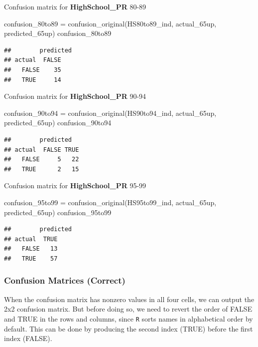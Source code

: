 \documentclass[
]{article}
\newenvironment{Shaded}{\begin{snugshade}}{\end{snugshade}}
\newcommand{\FunctionTok}[1]{\textcolor[rgb]{0.00,0.00,0.00}{#1}}
\newcommand{\NormalTok}[1]{#1}
\newcommand{\OtherTok}[1]{\textcolor[rgb]{0.56,0.35,0.01}{#1}}
\begin{document}
Confusion matrix for \textbf{HighSchool\_PR} 80-89

\begin{Shaded}
\begin{Highlighting}[]
\NormalTok{confusion\_80to89 }\OtherTok{=} \FunctionTok{confusion\_original}\NormalTok{(HS80to89\_ind, actual\_65up, predicted\_65up)}
\NormalTok{confusion\_80to89}
\end{Highlighting}
\end{Shaded}

\begin{verbatim}
##        predicted
## actual  FALSE
##   FALSE    35
##   TRUE     14
\end{verbatim}

Confusion matrix for \textbf{HighSchool\_PR} 90-94

\begin{Shaded}
\begin{Highlighting}[]
\NormalTok{confusion\_90to94 }\OtherTok{=} \FunctionTok{confusion\_original}\NormalTok{(HS90to94\_ind, actual\_65up, predicted\_65up)}
\NormalTok{confusion\_90to94}
\end{Highlighting}
\end{Shaded}

\begin{verbatim}
##        predicted
## actual  FALSE TRUE
##   FALSE     5   22
##   TRUE      2   15
\end{verbatim}

Confusion matrix for \textbf{HighSchool\_PR} 95-99

\begin{Shaded}
\begin{Highlighting}[]
\NormalTok{confusion\_95to99 }\OtherTok{=} \FunctionTok{confusion\_original}\NormalTok{(HS95to99\_ind, actual\_65up, predicted\_65up)}
\NormalTok{confusion\_95to99}
\end{Highlighting}
\end{Shaded}

\begin{verbatim}
##        predicted
## actual  TRUE
##   FALSE   13
##   TRUE    57
\end{verbatim}

\hypertarget{confusion-2x2-full}{%
\subsubsection{Confusion Matrices (Correct)}\label{confusion-2x2-full}}

When the confusion matrix has nonzero values in all four cells, we can
output the 2x2 confusion matrix. But before doing so, we need to revert
the order of FALSE and TRUE in the rows and columns, since \texttt{R}
sorts names in alphabetical order by default. This can be done by
producing the second index (TRUE) before the first index (FALSE).
\end{document}
